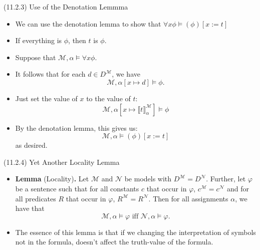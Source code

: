 \documentclass[../slides.tex]{subfiles}
\begin{document}
\begin{frame}{(11.2.3) Use of the Denotation Lemmma}

  \begin{itemize}
  \item We can use the denotation lemma to show that $\forall
    x\phi\vDash(\phi)[x:=t]$

  \item If everything is $\phi$, then $t$ is $\phi$.

  \item Suppose that $\mathcal{M},\alpha\vDash\forall x\phi$.

    \item It follows that for each $d\in D^\mathcal{M}$, we have
      \[\mathcal{M},\alpha[x\mapsto d]\vDash \phi.\]

    \item Just set the value of $x$ to the value of $t$:
      \[\mathcal{M},\alpha[x\mapsto \llbracket
        t\rrbracket^\mathcal{M}_\alpha]\vDash \phi\]

      \item By the denotation lemma, this gives
        us: \[\mathcal{M},\alpha\vDash(\phi)[x:=t]\] as desired.
        
    \end{itemize}



\end{frame}

\begin{frame}{(11.2.4) Yet Another Locality Lemma}

  \begin{itemize}

  \item \textbf{Lemma} (Locality)\textbf{.} Let $\mathcal{M}$ and
    $\mathcal{N}$ be models with 
              $D^\mathcal{M}=D^\mathcal{N}$. Further, let $\varphi$ be
              a sentence such that for all constants $c$ that occur in
              $\varphi$, $c^\mathcal{M}=c^\mathcal{N}$ and for all
              predicates $R$ that occur in $\varphi$,
              $R^\mathcal{M}=R^\mathcal{N}$. Then for all assignments
              $\alpha$, we have that \[\mathcal{M},\alpha\vDash
                \varphi\text{ iff }\mathcal{N},\alpha\vDash\varphi.\]

              \item The essence of this lemma is that if we changing
                the interpretation of symbols not in the formula,
                doesn't affect the truth-value of the formula.
              
  \end{itemize}
  
\end{frame}
\end{document}
